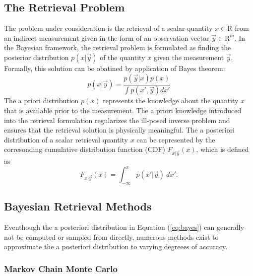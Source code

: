 \documentclass[journal abbreviation, manuscript]{copernicus}
\begin{document}
\subsection{The Retrieval Problem}

The problem under consideration is the retrieval of a scalar quantity $x \in
\mathrm{R}$ from an indirect measurement given in the form of an observation
vector $\vec{y} \in \mathrm{R}^m$. In the Bayesian framework, the retrieval
problem is formulated as finding the posterior distribution $p(x | \vec{y})$ of
the quantity $x$ given the measurement $\vec{y}$. Formally, this solution can be
obatined by application of Bayes theorem:
\begin{equation}\label{eq:bayes}
  p(x | \vec{y}) = \frac{p(\vec{y} | x)p(x)}{\int p(x', \vec{y}) dx'}
\end{equation}
The a priori distribution $p(x)$ represents the knowledge about the quantity $x$
that is available prior to the measurement. The a priori knowledge introduced
into the retrieval formulation regularizes the ill-posed inverse problem and
ensures that the retrieval solution is physically meaningful. The a posteriori
distribution of a scalar retrieval quantity $x$ can be represented by the
corresonding cumulative distribution function (CDF) $F_{x | \vec{y}}(x)$,
which is defined as 
\begin{equation}\label{eq:cdf}
F_{x | \vec{y}}(x) = \int_{-\infty}^{x} p(x' | \vec{y}) \: dx'.
\end{equation}

\subsection{Bayesian Retrieval Methods}

Eventhough the a posteriori distribution in Equation (\ref{eq:bayes}) can generally not
be computed or sampled from directly, numerous methods exist to approximate the a posteriori
distribution to varying degreees of accuracy. 

\subsubsection{Markov Chain Monte Carlo}
\end{document}
